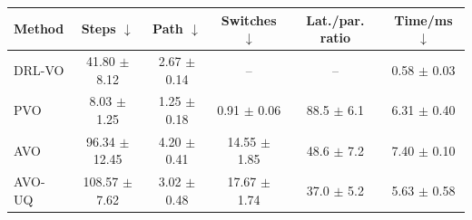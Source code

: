 \begin{tabular}{lccccc}
\toprule
Method & Steps $\downarrow$ & Path $\downarrow$ & Switches $\downarrow$ & Lat./par. ratio & Time/ms $\downarrow$ \\
\midrule
DRL-VO & 41.80 $\pm$ 8.12 & 2.67 $\pm$ 0.14 & -- & -- & 0.58 $\pm$ 0.03 \\
PVO & 8.03 $\pm$ 1.25 & 1.25 $\pm$ 0.18 & 0.91 $\pm$ 0.06 & 88.5 $\pm$ 6.1 & 6.31 $\pm$ 0.40 \\
AVO & 96.34 $\pm$ 12.45 & 4.20 $\pm$ 0.41 & 14.55 $\pm$ 1.85 & 48.6 $\pm$ 7.2 & 7.40 $\pm$ 0.10 \\
AVO-UQ & 108.57 $\pm$ 7.62 & 3.02 $\pm$ 0.48 & 17.67 $\pm$ 1.74 & 37.0 $\pm$ 5.2 & 5.63 $\pm$ 0.58 \\
\bottomrule
\end{tabular}
